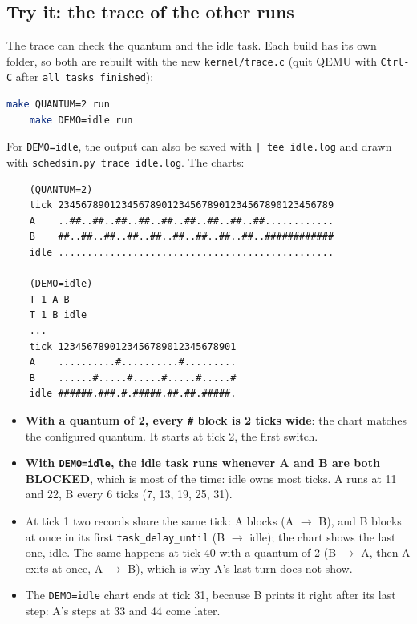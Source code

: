\subsection{Try it: the trace of the other runs}
The trace can check the quantum and the idle task. Each build has its own folder, so both are rebuilt with the new \texttt{kernel/trace.c} (quit QEMU with \texttt{Ctrl-C} after \texttt{all tasks finished}):
\begin{lstlisting}[language=bash]
    make QUANTUM=2 run
    make DEMO=idle run
\end{lstlisting}
For \texttt{DEMO=idle}, the output can also be saved with \texttt{| tee idle.log} and drawn with \texttt{schedsim.py trace idle.log}. The charts:
\begin{verbatim}
    (QUANTUM=2)
    tick 234567890123456789012345678901234567890123456789
    A    ..##..##..##..##..##..##..##..##..##............
    B    ##..##..##..##..##..##..##..##..##..############
    idle ................................................

    (DEMO=idle)
    T 1 A B
    T 1 B idle
    ...
    tick 1234567890123456789012345678901
    A    ..........#..........#.........
    B    ......#.....#.....#.....#.....#
    idle ######.###.#.#####.##.##.#####.
\end{verbatim}
\begin{itemize}
    \item \textbf{With a quantum of 2, every \texttt{\#} block is 2 ticks wide}: the chart matches the configured quantum. It starts at tick 2, the first switch.
    \item \textbf{With \texttt{DEMO=idle}, the idle task runs whenever A and B are both BLOCKED}, which is most of the time: idle owns most ticks. A runs at 11 and 22, B every 6 ticks (7, 13, 19, 25, 31).
    \item At tick 1 two records share the same tick: A blocks (A $\to$ B), and B blocks at once in its first \texttt{task\_delay\_until} (B $\to$ idle); the chart shows the last one, idle. The same happens at tick 40 with a quantum of 2 (B $\to$ A, then A exits at once, A $\to$ B), which is why A's last turn does not show.
    \item The \texttt{DEMO=idle} chart ends at tick 31, because B prints it right after its last step: A's steps at 33 and 44 come later.
\end{itemize}

